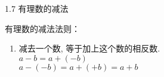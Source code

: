 \documentclass[aspectratio=169]{ctexbeamer} %
\date{\today}
\begin{document}
\begin{frame}[t]{1.7 有理数的减法}
\begin{spacing}{1.5}
\Large
有理数的减法法则：\\
\begin{enumerate}[label={\arabic*.}]
\item 减去一个数, 等于加上这个数的相反数.\\
$ a - b = a + (-b)$ \\
$ a - (-b) = a + (+b) = a + b$ \\
\end{enumerate}
\end{spacing}
\end{frame}
\end{document}
